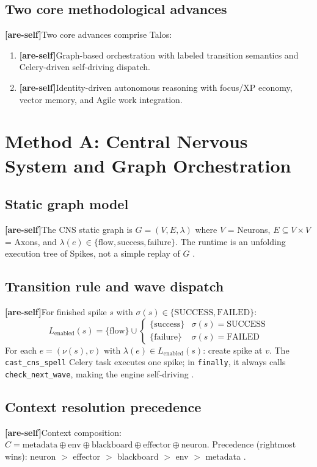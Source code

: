 \documentclass[11pt]{article}
\newcommand{\areself}{\textbf{[are-self]}}
\begin{document}
	\subsection{Two core methodological advances}
	\areself Two core advances comprise Talos:
	\begin{enumerate}[leftmargin=1.6em, label=(\Alph*)]
		\item \areself Graph-based orchestration with labeled transition semantics and Celery-driven self-driving dispatch.
		\item \areself Identity-driven autonomous reasoning with focus/XP economy, vector memory, and Agile work integration.
	\end{enumerate}
	
	\section{Method A: Central Nervous System and Graph Orchestration}
	\label{are-self:cns}
	\subsection{Static graph model}
	\areself The CNS static graph is $G = (V, E, \lambda)$ where $V$ = Neurons, $E \subseteq V \times V$ = Axons, and $\lambda(e) \in \{\text{flow}, \text{success}, \text{failure}\}$. The runtime is an unfolding execution tree of Spikes, not a simple replay of $G$ \cite{talosCNS,talosCombined}.
	
	\subsection{Transition rule and wave dispatch}
	\areself For finished spike $s$ with $\sigma(s) \in \{\text{SUCCESS}, \text{FAILED}\}$:
	$$
	L_{\text{enabled}}(s) = \{\text{flow}\} \cup \begin{cases} \{\text{success}\} & \sigma(s)=\text{SUCCESS} \\ \{\text{failure}\} & \sigma(s)=\text{FAILED} \end{cases}
	$$
	For each $e = (\nu(s), v)$ with $\lambda(e) \in L_{\text{enabled}}(s)$: create spike at $v$. The \texttt{cast\_cns\_spell} Celery task executes one spike; in \texttt{finally}, it always calls \texttt{check\_next\_wave}, making the engine self-driving \cite{talosCNS,talosLiveCodebase}.
	
	\subsection{Context resolution precedence}
	\areself Context composition: $C = \text{metadata} \oplus \text{env} \oplus \text{blackboard} \oplus \text{effector} \oplus \text{neuron}$. Precedence (rightmost wins): neuron $>$ effector $>$ blackboard $>$ env $>$ metadata \cite{talosCNS,talosCombined}.
	
\end{document}

